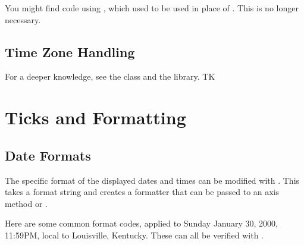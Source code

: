 You might find code using , which used to be used in place of . This is no longer necessary.


\subsection{Time Zone Handling}



For a deeper knowledge, see the  class and the  library. TK

\section{Ticks and Formatting}

\subsection{Date Formats}

The specific format of the displayed dates and times can be modified with . This takes a format string and creates a formatter that can be passed to an axis method  or . 

Here are some common format codes, applied to Sunday January 30, 2000, 11:59PM, local to Louisville, Kentucky. These can all be verified with .

